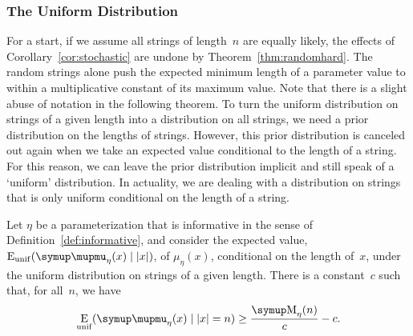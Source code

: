 \subsubsection{The Uniform Distribution}
For a start, if we assume all strings of length~$n$ are equally likely, the effects of Corollary~\ref{cor:stochastic} are undone by Theorem~\ref{thm:randomhard}.
The random strings alone push the expected minimum length of a parameter value to within a multiplicative constant of its maximum value.
Note that there is a slight abuse of notation in the following theorem.
To turn the uniform distribution on strings of a given length into a distribution on all strings, we need a prior distribution on the lengths of strings.
However, this prior distribution is canceled out again when we take an expected value conditional to the length of a string.
For this reason, we can leave the prior distribution implicit and still speak of a `uniform' distribution.
In actuality, we are dealing with a distribution on strings that is only uniform conditional on the length of a string.
\begin{theorem}
\label{thm:expected_uniform}%
  Let $\eta$ be a parameterization that is informative in the sense of Definition~\ref{def:informative}, and consider the expected value, $\Ex_\mathrm{unif}(\mu_\eta(x) \given \length{x})$, of $\mu_\eta(x)$, conditional on the length of~$x$, under the uniform distribution on strings of a given length.
  There is a constant~$c$ such that, for all~$n$, we have
  \begin{equation*}
    \Ex_\mathrm{unif}(\mu_\eta(x) \given \length{x} = n) \ge \frac{\upM_\eta(n)}{c} - c.
  \end{equation*}
\end{theorem}
